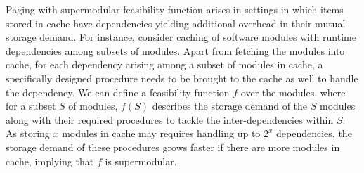 \documentclass[11pt]{article}
\newcommand{\comment}[1]{}
\begin{document}
{Paging with supermodular feasibility function arises in settings in which items stored in cache have dependencies yielding additional overhead in their mutual storage demand.
For instance, consider caching of software modules with runtime dependencies among subsets of modules. %
Apart from fetching the modules into cache, for each dependency arising among a subset of modules in cache, a specifically designed procedure needs to be brought to the cache as well to handle the dependency. We can define a feasibility function $f$ over the modules, where for a subset $S$ of modules, $f(S)$ describes the storage demand of the $S$ modules along with their required procedures to tackle the inter-dependencies within $S$. As storing $x$ modules in cache may requires handling up to $2^x$ dependencies, %
the storage demand of these procedures grows faster if there are more modules in cache, implying that $f$ is supermodular.   %
   
   }
    
   
   
   \comment{ Hence, supermodular paging can model the following online covering problem. Let $E = \{e_1,\ldots, e_n\}$ be a set of elements, where each of the given pages $p$ has a corresponding subset of elements $e(p) \subseteq E$. Our goal is to cover the entire set $E$ at all times, where a page contributes its elements to the cover only if it is outside of the cache, where the term "cache" simply refers to pages not chosen to the cover, and requested pages can be viewed as pages that temporarily cannot be used (e.g., a {\em fault} occurred). Then, a set $S$ is feasible in the cache if all elements are covered: $g(S) = \left| \bigcup_{p \in S} e(p) \right|$. 
   }
 
\end{document}
